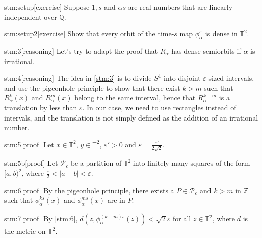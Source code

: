 \documentclass{article}
\begin{document}

\begin{stm}{stm:setup}[exercise]
Suppose $1, s$ and $\alpha s$ are real numbers that are linearly independent over $\mathbb{Q}$.
\end{stm}

\begin{stm}{stm:setup2}[exercise]
Show that every orbit of the time-$s$ map $\phi_\alpha^s$ is dense in $\mathbb{T}^2$.
\end{stm}


\begin{stm}{stm:3}[reasoning]
Let's try to adapt the proof that $R_\alpha$ has dense semiorbits if $\alpha$ is irrational.
\end{stm}

\begin{stm}{stm:4}[reasoning]
The idea in \ref{stm:3} is to divide $S^1$ into disjoint $\varepsilon$-sized intervals, and use the pigeonhole principle to show that there exist $k > m$ such that $R_\alpha^k(x)$ and $R_\alpha^m(x)$ belong to the same interval, hence that $R_\alpha^{k-m}$ is a translation by less than $\varepsilon$. In our case, we need to use rectangles instead of intervals, and the translation is not simply defined as the addition of an irrational number.
\end{stm}

\begin{stm}{stm:5}[proof]
Let $x \in \mathbb{T}^2$, $y \in \mathbb{T}^2$, $\varepsilon' > 0$ and $\varepsilon = \frac{\varepsilon'}{2\sqrt{2}}$. 
\end{stm}

\begin{stm}{stm:5b}[proof]
Let $\mathcal{P}_\varepsilon$ be a partition of $\mathbb{T}^2$ into finitely many squares of the form $[a,b)^2$, where $\frac{\varepsilon}{2} < |a-b| < \varepsilon$.
\end{stm}

\begin{stm}{stm:6}[proof]
By the pigeonhole principle, there exists a $P \in \mathcal{P}_\varepsilon$ and $k > m$ in $\mathbb{Z}$ such that $\phi_\alpha^{ks}(x)$ and $\phi_\alpha^{ms}(x)$ are in $P$.
\end{stm}

\begin{stm}{stm:7}[proof]
By \ref{stm:6}, $d(z, \phi_\alpha^{(k-m)s}(z)) < \sqrt{2} \varepsilon$ for all $z \in \mathbb{T}^2$, where $d$ is the metric on $\mathbb{T}^2$.
\end{stm}
\end{document}
